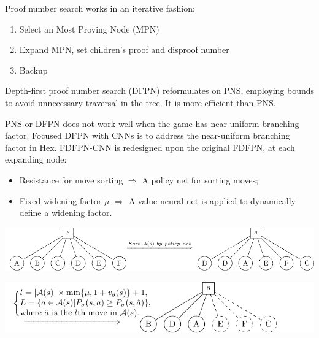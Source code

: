 \documentclass[a0,portrait]{a0poster}
\begin{document}
\begin{multicols}{3}
\vspace{1cm}
Proof number search works in an iterative fashion: 
\begin{enumerate}
\item Select an Most Proving Node (MPN)
\item Expand MPN, set children's proof and disproof number
\item Backup 
\end{enumerate}

Depth-first proof number search (DFPN) reformulates on PNS, employing bounds to avoid unnecessary traversal in the tree. 
It is more efficient than PNS.

PNS or DFPN does not work well when the game has near uniform branching factor. 
Focused DFPN with CNNs is to address the near-uniform branching factor in Hex. FDFPN-CNN is redesigned upon the original FDFPN, at each expanding node:
\begin{itemize}
\item Resistance for move sorting $\Rightarrow$ A policy net for sorting moves;
\item Fixed widening factor $\mu$ $\Rightarrow$ A value neural net is applied to dynamically define a widening factor.
\end{itemize}

\begin{center}\vspace{1cm}
\includegraphics[width=0.8\linewidth]{andor1.pdf}
\end{center}%

\begin{center}\vspace{1cm}
\includegraphics[width=0.8\linewidth]{andor2.pdf}
\end{center}%


\end{multicols}
\end{document}
